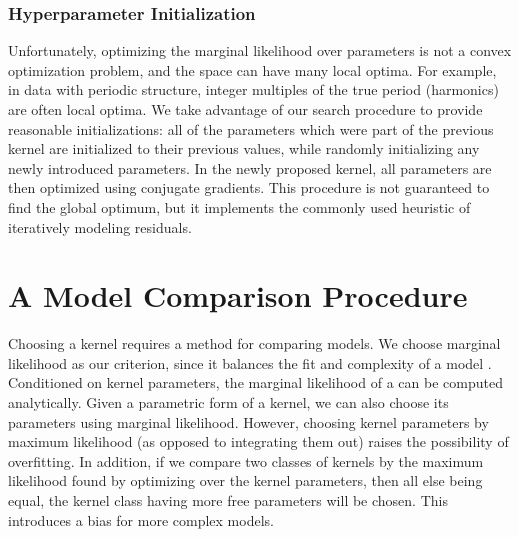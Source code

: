 



\subsubsection{Hyperparameter Initialization}

Unfortunately, optimizing the marginal likelihood over parameters is not a convex optimization problem, and the space can have many local optima.
For example, in data with periodic structure, integer multiples of the true period (harmonics) are often local optima. 
We take advantage of our search procedure to provide reasonable initializations: all of the parameters which were part of the previous kernel are initialized to their previous values, while randomly initializing any newly introduced parameters.
In the newly proposed kernel, all parameters are then optimized using conjugate gradients.
This procedure is not guaranteed to find the global optimum, but it implements the commonly used heuristic of iteratively modeling residuals.






\section{A Model Comparison Procedure}

Choosing a kernel requires a method for comparing models.
We choose marginal likelihood as our criterion, since it balances the fit and complexity of a model \citep{rasmussen2001occam}.
Conditioned on kernel parameters, the marginal likelihood of a \gp{} can be computed analytically.
Given a parametric form of a kernel, we can also choose its parameters using marginal likelihood.
However, choosing kernel parameters by maximum likelihood (as opposed to integrating them out) raises the possibility of overfitting.
In addition, if we compare two classes of kernels by the maximum likelihood found by optimizing over the kernel parameters, then all else being equal, the kernel class having more free parameters will be chosen.
This introduces a bias for more complex models.


